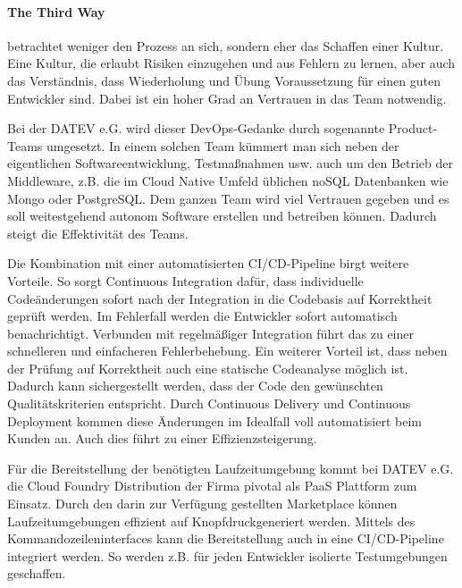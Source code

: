 \paragraph{\glqq The Third Way\grqq} betrachtet weniger den Prozess an sich, sondern eher das Schaffen einer Kultur.
Eine Kultur, die erlaubt Risiken einzugehen und aus Fehlern zu lernen, aber auch das Verständnis, dass Wiederholung und Übung Voraussetzung für einen guten Entwickler sind.
Dabei ist ein hoher Grad an Vertrauen in das Team notwendig.

Bei der DATEV e.G. wird dieser DevOps-Gedanke durch sogenannte \glqq Product-Teams\grqq{} umgesetzt.
In einem solchen Team kümmert man sich neben der eigentlichen Softwareentwicklung, Testmaßnahmen usw. auch um den Betrieb der Middleware, z.B. die im Cloud Native Umfeld üblichen noSQL Datenbanken wie Mongo oder PostgreSQL. 
Dem ganzen Team wird viel Vertrauen gegeben und es soll weitestgehend autonom Software erstellen und betreiben können.
Dadurch steigt die Effektivität des Teams.

Die Kombination mit einer automatisierten CI/CD-Pipeline birgt weitere Vorteile.
So sorgt Continuous Integration dafür, dass individuelle Codeänderungen sofort nach der Integration in die Codebasis auf Korrektheit geprüft werden.
Im Fehlerfall werden die Entwickler sofort automatisch benachrichtigt. 
Verbunden mit regelmäßiger Integration führt das zu einer schnelleren und einfacheren Fehlerbehebung.
Ein weiterer Vorteil ist, dass neben der Prüfung auf Korrektheit auch eine statische Codeanalyse möglich ist.
Dadurch kann sichergestellt werden, dass der Code den gewünschten Qualitätskriterien entspricht.
Durch Continuous Delivery und Continuous Deployment kommen diese Änderungen im Idealfall voll automatisiert beim Kunden an.
Auch dies führt  zu einer Effizienzsteigerung.

Für die Bereitstellung der benötigten Laufzeitumgebung kommt bei DATEV e.G. die Cloud Foundry Distribution der Firma \glqq pivotal\grqq{} als PaaS Plattform zum Einsatz.
Durch den darin zur Verfügung gestellten \glqq Marketplace\grqq{} können Laufzeitumgebungen effizient \glqq auf Knopfdruck\grqq generiert werden.
Mittels des Kommandozeileninterfaces kann die Bereitstellung auch in eine CI/CD-Pipeline integriert werden.
So werden z.B. für jeden Entwickler isolierte Testumgebungen geschaffen.

